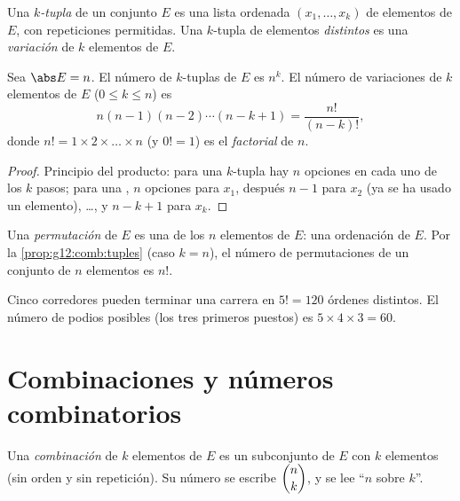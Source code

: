 \begin{definition}[$k$-tuplas]\label{def:g12:comb:tuples}
Una \emph{$k$-tupla} de un conjunto $E$ es una lista ordenada
$(x_1, \dots, x_k)$ de elementos de $E$, con repeticiones permitidas. Una
$k$-tupla de elementos \emph{distintos} es una
\emph{variación} de $k$ elementos de $E$.
\end{definition}

\begin{proposition}\label{prop:g12:comb:tuples}
Sea $\abs E = n$. El número de $k$-tuplas de $E$ es $n^k$. El número de
variaciones de $k$ elementos de $E$ ($0 \leq k \leq n$) es
\[
n(n-1)(n-2)\cdots(n-k+1) = \frac{n!}{(n-k)!},
\]
donde $n! = 1 \times 2 \times \dots \times n$ (y $0! = 1$) es el
\emph{factorial} de $n$.
\end{proposition}

\begin{proof}
Principio del producto: para una $k$-tupla hay $n$ opciones en cada uno de
los $k$ pasos; para una , $n$ opciones para $x_1$, después $n - 1$
para $x_2$ (ya se ha usado un elemento), \dots, y $n - k + 1$ para $x_k$.
\end{proof}

\begin{definition}[Permutación]\label{def:g12:comb:permutation}
Una \emph{permutación} de $E$ es una  de los $n$
elementos de $E$: una ordenación de $E$. Por la
\cref{prop:g12:comb:tuples} (caso $k = n$), el número de permutaciones de un
conjunto de $n$ elementos es $n!$.
\end{definition}

\begin{example}
Cinco corredores pueden terminar una carrera en $5! = 120$ órdenes
distintos. El número de podios posibles (los tres primeros puestos) es
$5 \times 4 \times 3 = 60$.
\end{example}

\section{Combinaciones y números combinatorios}

\begin{definition}[Combinaciones]\label{def:g12:comb:combination}
Una \emph{combinación} de $k$ elementos de $E$ es un
subconjunto de $E$ con $k$ elementos (sin orden y sin repetición). Su número
se escribe $\dbinom{n}{k}$, y se lee ``$n$ sobre
$k$''.
\end{definition}

